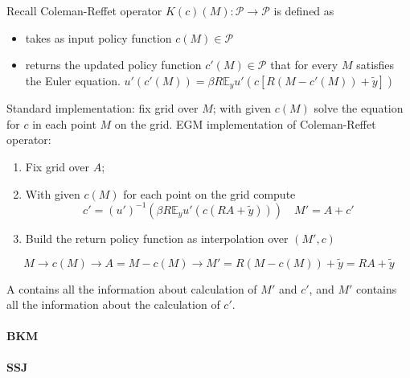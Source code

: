 \documentclass[11pt,a4paper]{article}
\begin{document}
Recall Coleman-Reffet operator $K(c)(M):\mathcal{P}\to \mathcal{P}$ is defined as 
\begin{itemize}
    \item takes as input policy function $c(M)\in \mathcal{P}$
    \item returns the updated policy function $c'(M)\in \mathcal{P}$ that for every $M$ satisfies the Euler equation. $u'(c'(M)) = \beta R \mathbb{E}_y u'(c[R(M-c'(M))+\tilde{y}])$
\end{itemize}
Standard implementation: fix grid over $M$; with given $c(M)$ solve the equation for $c$ in each point $M$ on the grid. 
EGM implementation of Coleman-Reffet operator:
\begin{enumerate}
    \item Fix grid over $A$;
    \item With given $c(M)$ for each point on the grid compute $$ c' = (u')^{-1}\left(\beta R\mathbb{E}_y u'(c(RA+\tilde{y}))\right)\quad M' = A + c'$$ 
    \item Build the return policy function as interpolation over $(M',c)$ 
\end{enumerate}
$$ M\to c(M)\to A = M-c(M) \to M' = R(M-c(M))+\tilde{y} = RA+\tilde{y} $$

A contains all the information about calculation of $M'$ and $c'$, and $M'$ contains all the information about the calculation of $c'$.

\paragraph{BKM\citep{boppartExploitingMITShocks2018}}




\paragraph{SSJ\citep{auclertUsingSequenceSpaceJacobian2021}}



\end{document}
